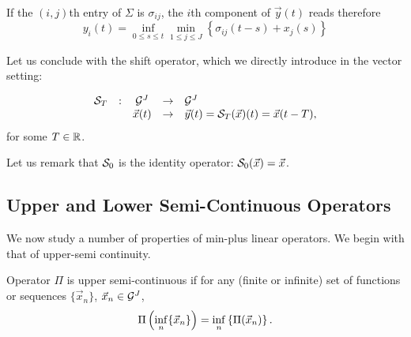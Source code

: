 If the $(i,j)$th entry of $\Sigma$ is $\sigma_{ij}$, the $i$th component of $\vec{y}(t)$ reads therefore
$$ y_i(t) =  \inf_{0 \leq s \leq t} \min_{1 \leq j \leq J} \left\{ \sigma_{ij}(t-s) + x_j(s) \right\} $$

Let us conclude with the shift operator, which we directly introduce in the vector setting:
\begin{definition}
$$ \begin{array}{ccccl}
\mathcal S_T & : & \mathcal G^J & \rightarrow & \mathcal G^J \\
        & & \vec{x}(t) & \rightarrow & \vec{y}(t) = \mathcal S_T(\vec{x})(t) =  \vec{x}(t-T), \end{array} $$
for some $T \in \mathbb{R}$.
\end{definition}
Let us remark that $\mathcal S_0$ is the identity operator: $\mathcal S_0(\vec{x}) = \vec{x}$.





\subsection{Upper and Lower Semi-Continuous Operators}


We now study a number of properties of min-plus linear operators.
We begin with that of upper-semi continuity.

\begin{definition}
Operator $\Pi$ is upper semi-continuous if for any (finite or infinite) set of functions or sequences $\{ \vec{x}_n \}$,
$\vec{x}_n \in \mathcal G^{J}$,
\begin{equation}
\mylabel{eq:usc}
\Pi \left( \inf_n \{ \vec{x}_n \} \right) =  \inf_{n} \left\{ \Pi ( \vec{x}_n) \right\}.
\end{equation}
\end{definition}

